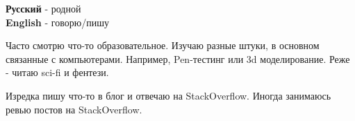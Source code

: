 
\begin{minipage}[t]{0.3\textwidth}
	\vspace{-\baselineskip} %


	\textbf{Русский} - родной\\
	\textbf{English} - говорю/пишу\\
\end{minipage}
\hfill
\begin{minipage}[t]{0.3\textwidth}
	\vspace{-\baselineskip} %


	Часто смотрю что-то образовательное. Изучаю разные штуки, в основном связанные с компьютерами. Например, Pen-тестинг или 3d моделирование.
	Реже - читаю sci-fi и фентези.
\end{minipage}
\hfill
\begin{minipage}[t]{0.3\textwidth}
	\vspace{-\baselineskip} %


	Изредка пишу что-то в блог и отвечаю на StackOverflow. Иногда занимаюсь ревью постов на StackOverflow.
\end{minipage}



